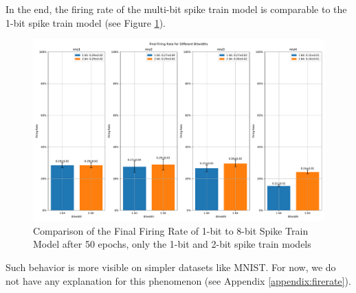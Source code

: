         In the end, the firing rate of the multi-bit spike train model is comparable to the 1-bit spike train model (see Figure \ref{fig:final_firing_rate}).
        \begin{figure}[!htpb]
            \centering
            \includegraphics[width=\textwidth]{../firerate/FashionMNIST/plots/fashionmnist_final_firerate.pdf}
            \caption{Comparison of the Final Firing Rate of 1-bit to 8-bit Spike Train Model after 50 epochs, only the 1-bit and 2-bit spike train models}
            \label{fig:final_firing_rate}
        \end{figure}

        Such behavior is more visible on simpler datasets like MNIST. For now, we do not have any explanation for this phenomenon (see Appendix \ref{appendix:firerate}).

